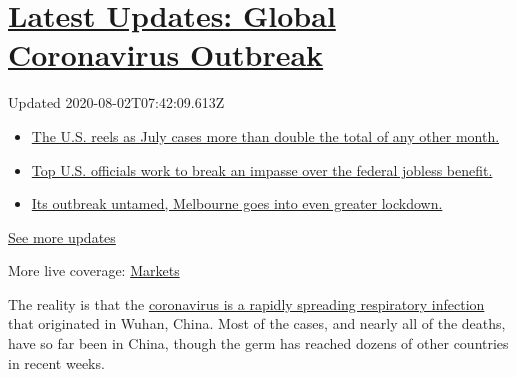 \hypertarget{latest-updates-global-coronavirus-outbreak}{%
\section{\texorpdfstring{\href{https://www.nytimes3xbfgragh.onion/2020/08/01/world/coronavirus-covid-19.html?action=click\&pgtype=Article\&state=default\&region=MAIN_CONTENT_1\&context=storylines_live_updates}{Latest
Updates: Global Coronavirus
Outbreak}}{Latest Updates: Global Coronavirus Outbreak}}\label{latest-updates-global-coronavirus-outbreak}}

Updated 2020-08-02T07:42:09.613Z

\begin{itemize}
\tightlist
\item
  \href{https://www.nytimes3xbfgragh.onion/2020/08/01/world/coronavirus-covid-19.html?action=click\&pgtype=Article\&state=default\&region=MAIN_CONTENT_1\&context=storylines_live_updates\#link-34047410}{The
  U.S. reels as July cases more than double the total of any other
  month.}
\item
  \href{https://www.nytimes3xbfgragh.onion/2020/08/01/world/coronavirus-covid-19.html?action=click\&pgtype=Article\&state=default\&region=MAIN_CONTENT_1\&context=storylines_live_updates\#link-780ec966}{Top
  U.S. officials work to break an impasse over the federal jobless
  benefit.}
\item
  \href{https://www.nytimes3xbfgragh.onion/2020/08/01/world/coronavirus-covid-19.html?action=click\&pgtype=Article\&state=default\&region=MAIN_CONTENT_1\&context=storylines_live_updates\#link-2bc8948}{Its
  outbreak untamed, Melbourne goes into even greater lockdown.}
\end{itemize}

\href{https://www.nytimes3xbfgragh.onion/2020/08/01/world/coronavirus-covid-19.html?action=click\&pgtype=Article\&state=default\&region=MAIN_CONTENT_1\&context=storylines_live_updates}{See
more updates}

More live coverage:
\href{https://www.nytimes3xbfgragh.onion/live/2020/07/31/business/stock-market-today-coronavirus?action=click\&pgtype=Article\&state=default\&region=MAIN_CONTENT_1\&context=storylines_live_updates}{Markets}

The reality is that the
\href{https://www.nytimes3xbfgragh.onion/article/what-is-coronavirus.html?action=click\&pgtype=Article\&state=default\&module=styln-coronavirus\&variant=show\&region=MID_MAIN_CONTENT\&context=storyline_guide}{coronavirus
is a rapidly spreading respiratory infection} that originated in Wuhan,
China. Most of the cases, and nearly all of the deaths, have so far been
in China, though the germ has reached dozens of other countries in
recent weeks.

